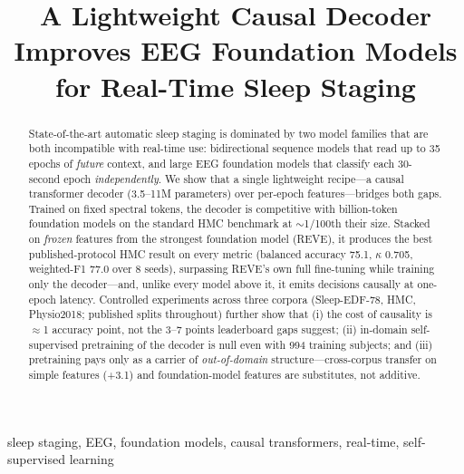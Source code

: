 \documentclass[conference,10pt]{IEEEtran}
\begin{document}
\title{A Lightweight Causal Decoder Improves EEG Foundation Models\\for Real-Time Sleep Staging}

\author{
\and
{}
}

\maketitle

\begin{abstract}
State-of-the-art automatic sleep staging is dominated by two model families that are both incompatible with real-time use: bidirectional sequence models that read up to 35 epochs of \emph{future} context, and large EEG foundation models that classify each 30-second epoch \emph{independently}. We show that a single lightweight recipe---a causal transformer decoder (3.5--11M parameters) over per-epoch features---bridges both gaps. Trained on fixed spectral tokens, the decoder is competitive with billion-token foundation models on the standard HMC benchmark at $\sim$1/100th their size. Stacked on \emph{frozen} features from the strongest foundation model (REVE), it produces the best published-protocol HMC result on every metric (balanced accuracy 75.1, $\kappa$ 0.705, weighted-F1 77.0 over 8 seeds), surpassing REVE's own full fine-tuning while training only the decoder---and, unlike every model above it, it emits decisions causally at one-epoch latency. Controlled experiments across three corpora (Sleep-EDF-78, HMC, Physio2018; published splits throughout) further show that (i) the cost of causality is $\approx$1 accuracy point, not the 3--7 points leaderboard gaps suggest; (ii) in-domain self-supervised pretraining of the decoder is null even with 994 training subjects; and (iii) pretraining pays only as a carrier of \emph{out-of-domain} structure---cross-corpus transfer on simple features (+3.1) and foundation-model features are substitutes, not additive.
\end{abstract}

\begin{IEEEkeywords}
sleep staging, EEG, foundation models, causal transformers, real-time, self-supervised learning
\end{IEEEkeywords}
\end{document}
